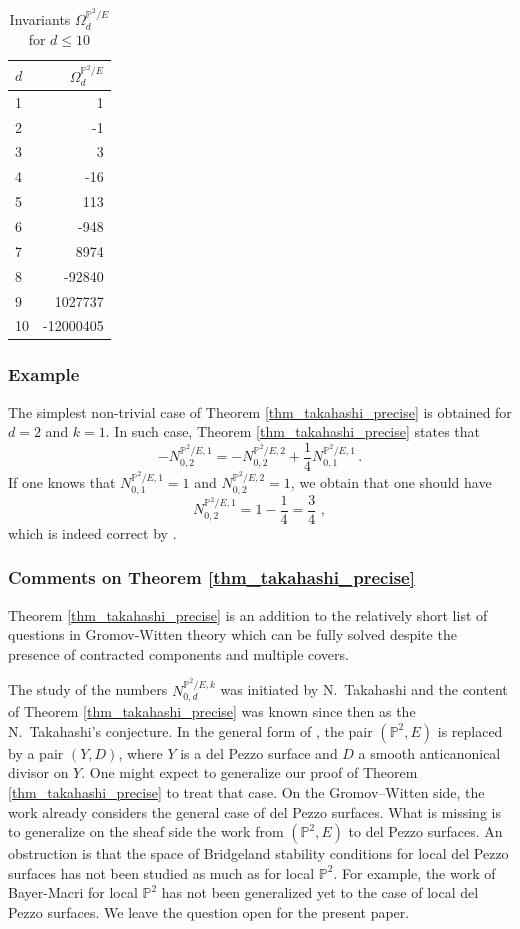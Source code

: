 \documentclass[11pt,letterpaper]{amsart}
\newcommand\PP{\mathbb P}
\begin{document}
\begin{table}[H]
\centering
\begin{tabular}{l|r}
$d$ & $\Omega_d^{\PP^2/E}$ \\\hline
1 & 1 \\
2 & -1 \\
3 & 3 \\
4 & -16 \\
5 & 113 \\
6 & -948 \\
7 & 8974 \\
8 & -92840 \\
9 & 1027737 \\
10 & -12000405
\end{tabular}
\caption{\label{tab:widgets}
Invariants $\Omega_d^{\PP^2/E}$ for $d \leqslant 10$}
\label{table_bps}
\end{table}


\subsubsection{Example} The simplest non-trivial case of Theorem \ref{thm_takahashi_precise}
is obtained for
$d=2$ and $k=1$. In such case, Theorem 
\ref{thm_takahashi_precise} states that 
\[- N_{0,2}^{\PP^2/E,1}
=-N_{0,2}^{\PP^2/E,2}+\frac{1}{4}N_{0,1}^{\PP^2/E,1}\,.\]
If one knows that 
$N_{0,1}^{\PP^2/E,1}=1$
and $N_{0,2}^{\PP^2/E,2}
=1$, we obtain that one should have 
\[ N_{0,2}^{\PP^2/E,1}=1-\frac{1}{4}=\frac{3}{4}\,\,,\]
which is indeed correct by 
\cite[Proposition 6.1]{MR2667135}.

\subsubsection{Comments on Theorem \ref{thm_takahashi_precise}}

Theorem \ref{thm_takahashi_precise} is an addition to the relatively short list of questions in Gromov-Witten theory which can be fully solved despite the presence of
contracted components and multiple covers.


The study of the numbers
$N_{0,d}^{\PP^2/E,k}$ was initiated by 
N.\ Takahashi  \cite{takahashi9605007curves, MR1844627} and the content of Theorem \ref{thm_takahashi_precise} was known since then as the N.\ Takahashi's conjecture. 
In the general form of \cite[Conjecture 1.3]{choi2018log}, the pair $(\PP^2,E)$ is replaced by a pair $(Y,D)$, 
where $Y$ is a del Pezzo surface and $D$ a smooth anticanonical divisor on $Y$. One might expect to generalize our proof of 
Theorem \ref{thm_takahashi_precise} to treat that case. 
On the Gromov--Witten side, the work \cite{gabele2019tropical} already considers the general case of del Pezzo surfaces. What is missing is to generalize on the sheaf side the work \cite{bousseau2019scattering} from $(\PP^2,E)$ to del Pezzo surfaces.
An obstruction is that the space of Bridgeland stability conditions for local del Pezzo surfaces has not been studied as much as for local $\PP^2$. For example, the work of Bayer-Macri \cite{MR2852118} for local $\PP^2$ has not been generalized yet to the case of local del Pezzo surfaces.
We leave the question open for the present paper.
\end{document}
